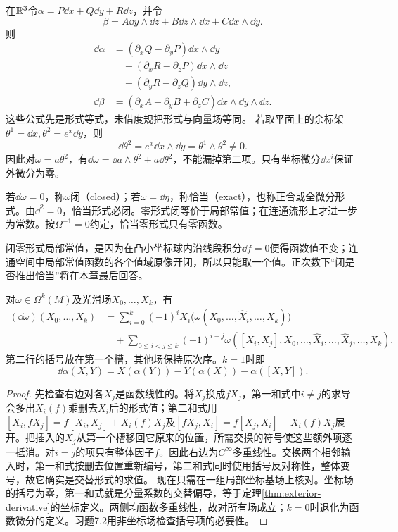 \begin{example}[低次公式与非坐标余标架]\label{ex:d-coframe}
在$\mathbb{R}^3$令$\alpha=P\dd x+Q\dd y+R\dd z$，并令
\[
 \beta=A\dd y\wedge\dd z+B\dd z\wedge\dd x+C\dd x\wedge\dd y.
\]
则
\begin{align*}
 \dd\alpha
 &=(\partial_xQ-\partial_yP)\dd x\wedge\dd y\\
 &\quad +(\partial_xR-\partial_zP)\dd x\wedge\dd z\\
 &\quad +(\partial_yR-\partial_zQ)\dd y\wedge\dd z,\\
 \dd\beta
 &=(\partial_xA+\partial_yB+\partial_zC)\dd x\wedge\dd y\wedge\dd z.
\end{align*}
这些公式先是形式等式，未借度规把形式与向量场等同。
若取平面上的余标架$\theta^1=\dd x,\theta^2=e^x\dd y$，则
\[
 \dd\theta^2=e^x\dd x\wedge\dd y=\theta^1\wedge\theta^2\ne0.
\]
因此对$\omega=a\theta^2$，有$\dd\omega=\dd a\wedge\theta^2+a\dd\theta^2$，不能漏掉第二项。只有坐标微分$\dd x^i$保证外微分为零。
\end{example}
\begin{definition}[闭形式与恰当形式]
若$\dd\omega=0$，称$\omega$闭（closed）；若$\omega=\dd\eta$，称恰当（exact），也称正合或全微分形式。由$\dd^2=0$，恰当形式必闭。零形式闭等价于局部常值；在连通流形上才进一步为常数。按$\Omega^{-1}=0$约定，恰当零形式只有零函数。
\end{definition}
闭零形式局部常值，是因为在凸小坐标球内沿线段积分$\dd f=0$便得函数值不变；连通空间中局部常值函数的各个值域原像开闭，所以只能取一个值。正次数下“闭是否推出恰当”将在本章最后回答。
\begin{proposition}[外微分的无坐标求值式]\label{prop:koszul-d}
对$\omega\in\Omega^k(M)$及光滑场$X_0,\ldots,X_k$，有
\begin{align*}
 (\dd\omega)(X_0,\ldots,X_k)
 &=\sum_{i=0}^k(-1)^i X_i\bigl(\omega(X_0,\ldots,\widehat X_i,\ldots,X_k)\bigr)\\
 &\quad+\sum_{0\leq i<j\leq k}(-1)^{i+j}
 \omega([X_i,X_j],X_0,\ldots,\widehat X_i,\ldots,\widehat X_j,\ldots,X_k).
\end{align*}
第二行的括号放在第一个槽，其他场保持原次序。$k=1$时即
\[
 \dd\alpha(X,Y)=X(\alpha(Y))-Y(\alpha(X))-\alpha([X,Y]).
\]
\end{proposition}
\begin{proof}
先检查右边对各$X_j$是函数线性的。将$X_j$换成$fX_j$，第一和式中$i\ne j$的求导会多出$X_i(f)$乘删去$X_i$后的形式值；第二和式用$[X_i,fX_j]=f[X_i,X_j]+X_i(f)X_j$及$[fX_j,X_i]=f[X_j,X_i]-X_i(f)X_j$展开。把插入的$X_j$从第一个槽移回它原来的位置，所需交换的符号使这些额外项逐一抵消。对$i=j$的项只有整体因子$f$。因此右边为$C^\infty$多重线性。交换两个相邻输入时，第一和式按删去位置重新编号，第二和式同时使用括号反对称性，整体变号，故它确实是交替形式的求值。
现在只需在一组局部坐标基场上核对。坐标场的括号为零，第一和式就是分量系数的交替偏导，等于定理\ref{thm:exterior-derivative}的坐标定义。两侧均函数多重线性，故对所有场成立；$k=0$时退化为函数微分的定义。习题7.2用非坐标场检查括号项的必要性。
\end{proof}
